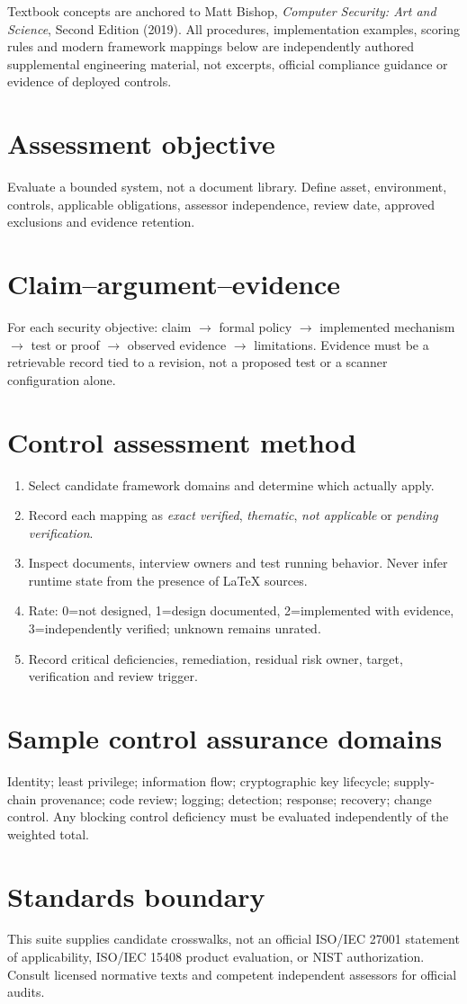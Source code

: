 \documentclass[10pt,letterpaper]{article}
\begin{document}
\makedoctocpage
\begin{notebox}
Textbook concepts are anchored to Matt Bishop, \emph{Computer Security: Art and Science}, Second Edition (2019). All procedures, implementation examples, scoring rules and modern framework mappings below are independently authored supplemental engineering material, not excerpts, official compliance guidance or evidence of deployed controls.
\end{notebox}
\section{Assessment objective}
Evaluate a bounded system, not a document library. Define asset, environment, controls, applicable obligations, assessor independence, review date, approved exclusions and evidence retention.
\section{Claim--argument--evidence}
For each security objective: claim $\rightarrow$ formal policy $\rightarrow$ implemented mechanism $\rightarrow$ test or proof $\rightarrow$ observed evidence $\rightarrow$ limitations. Evidence must be a retrievable record tied to a revision, not a proposed test or a scanner configuration alone.
\section{Control assessment method}
\begin{enumerate}
\item Select candidate framework domains and determine which actually apply.
\item Record each mapping as \emph{exact verified}, \emph{thematic}, \emph{not applicable} or \emph{pending verification}.
\item Inspect documents, interview owners and test running behavior. Never infer runtime state from the presence of LaTeX sources.
\item Rate: 0=not designed, 1=design documented, 2=implemented with evidence, 3=independently verified; unknown remains unrated.
\item Record critical deficiencies, remediation, residual risk owner, target, verification and review trigger.
\end{enumerate}
\section{Sample control assurance domains}
Identity; least privilege; information flow; cryptographic key lifecycle; supply-chain provenance; code review; logging; detection; response; recovery; change control. Any blocking control deficiency must be evaluated independently of the weighted total.
\section{Standards boundary}
This suite supplies candidate crosswalks, not an official ISO/IEC 27001 statement of applicability, ISO/IEC 15408 product evaluation, or NIST authorization. Consult licensed normative texts and competent independent assessors for official audits.
\end{document}
